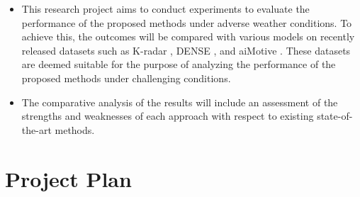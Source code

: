 \documentclass[rnd]{mas_proposal}
\begin{document}
\begin{itemize}
      \item This research project aims to conduct experiments to evaluate the performance of the proposed methods under adverse weather conditions. To achieve this, the outcomes will be compared with various models on recently released datasets such as K-radar \cite{Paek2022Jun}, DENSE \cite{bijelic2020seeing}, and aiMotive \cite{Matuszka2022Nov}. These datasets are deemed suitable for the purpose of analyzing the performance of the proposed methods under challenging conditions.
      
      \item The comparative analysis of the results will include an assessment of the strengths and weaknesses of each approach with respect to existing state-of-the-art methods.

\end{itemize}

\section{Project Plan}
\end{document}
